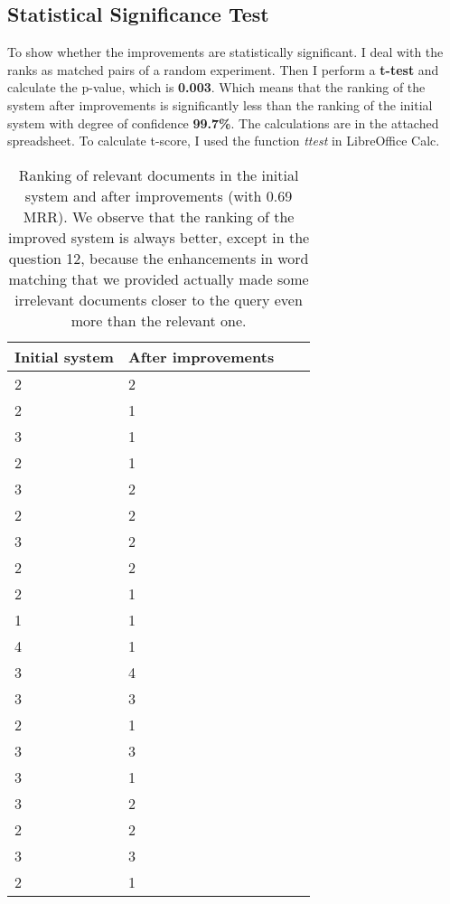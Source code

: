 \documentclass{article}
\begin{document}
\subsection{Statistical Significance Test}

To show whether the improvements are statistically significant. I deal with the ranks as matched pairs of a random experiment. Then I perform a \textbf{t-test} and calculate the p-value, which is \textbf{0.003}. Which means that the ranking of the system after improvements is significantly less than the ranking of the initial system with degree of confidence \textbf{99.7\%}. The calculations are in the attached spreadsheet. To calculate t-score, I used the function \textit{ttest} in LibreOffice Calc.

\begin{table}
\centering
\begin{tabular}{|l | l | l | l |}
  	\hline
  	Initial system & After improvements \\
  	\hline
2 & 2 \\
2 & 1 \\
3 & 1 \\
2 & 1 \\
3 & 2 \\
2 & 2 \\
3 & 2 \\
2 & 2 \\
2 & 1 \\
1 & 1 \\
4 & 1 \\
3 & 4 \\
3 & 3 \\
2 & 1 \\
3 & 3 \\
3 & 1 \\
3 & 2 \\
2 & 2 \\
3 & 3 \\
2 & 1 \\
 	\hline
\end{tabular}
\caption{Ranking of relevant documents in the initial system and after improvements (with 0.69 MRR). We observe that the ranking of the improved system is always better, except in the question 12, because the enhancements in word matching that we provided actually made some irrelevant documents closer to the query even more than the relevant one.}
\label{tab:rank}
\end{table}
\end{document}
